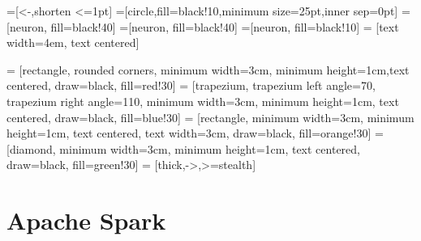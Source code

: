 \documentclass[12pt, right open]{memoir}
\begin{document}
=[<-,shorten <=1pt]
=[circle,fill=black!10,minimum size=25pt,inner sep=0pt]
=[neuron, fill=black!40]
=[neuron, fill=black!40]
=[neuron, fill=black!10]
 = [text width=4em, text centered]

 = [rectangle, rounded corners, minimum width=3cm, minimum height=1cm,text centered, draw=black, fill=red!30]
 = [trapezium, trapezium left angle=70, trapezium right angle=110, minimum width=3cm, minimum height=1cm, text centered, draw=black, fill=blue!30]
 = [rectangle, minimum width=3cm, minimum height=1cm, text centered, text width=3cm, draw=black, fill=orange!30]
 = [diamond, minimum width=3cm, minimum height=1cm, text centered, draw=black, fill=green!30]
 = [thick,->,>=stealth]


\tableofcontents
\listoffigures
\listoftables

%

%


%

%

\part{Apache Spark}

\end{document}
